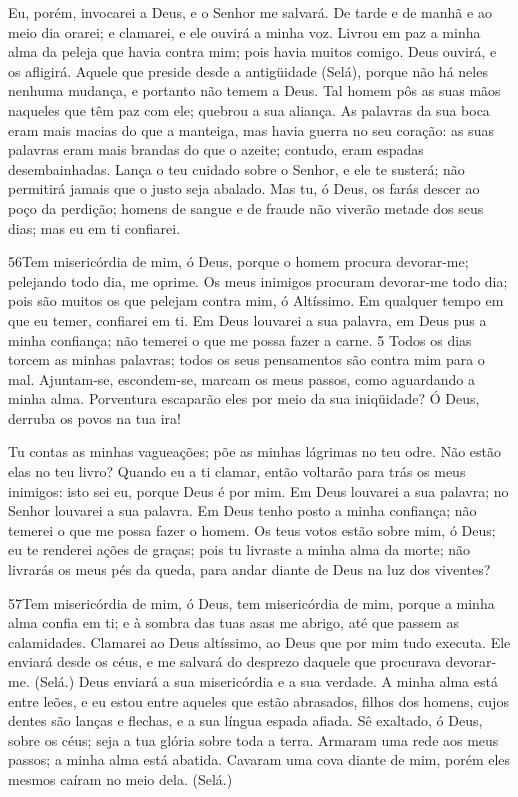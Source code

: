 Eu, porém, invocarei a Deus, e o Senhor me salvará. De
tarde e de manhã e ao meio dia orarei; e clamarei, e ele ouvirá a
minha voz. Livrou em paz a minha alma da peleja que havia
contra mim; pois havia muitos comigo. Deus ouvirá, e os
afligirá. Aquele que preside desde a antigüidade (Selá), porque não
há neles nenhuma mudança, e portanto não temem a Deus. Tal
homem pôs as suas mãos naqueles que têm paz com ele; quebrou a sua
aliança. As palavras da sua boca eram mais macias do que a
manteiga, mas havia guerra no seu coração: as suas palavras eram
mais brandas do que o azeite; contudo, eram espadas desembainhadas.
Lança o teu cuidado sobre o Senhor, e ele te susterá; não
permitirá jamais que o justo seja abalado. Mas tu, ó Deus, os
farás descer ao poço da perdição; homens de sangue e de fraude não
viverão metade dos seus dias; mas eu em ti confiarei.

\bigskip

\lettrine{56}{}Tem misericórdia de mim, ó Deus, porque o homem
procura devorar-me; pelejando todo dia, me oprime. Os meus
inimigos procuram devorar-me todo dia; pois são muitos os que
pelejam contra mim, ó Altíssimo. Em qualquer tempo em que eu
temer, confiarei em ti. Em Deus louvarei a sua palavra, em Deus
pus a minha confiança; não temerei o que me possa fazer a carne. 5
Todos os dias torcem as minhas palavras; todos os seus pensamentos
são contra mim para o mal. Ajuntam-se, escondem-se, marcam os
meus passos, como aguardando a minha alma. Porventura escaparão
eles por meio da sua iniqüidade? Ó Deus, derruba os povos na tua
ira!

Tu contas as minhas vagueações; põe as minhas lágrimas no teu
odre. Não estão elas no teu livro? Quando eu a ti clamar, então
voltarão para trás os meus inimigos: isto sei eu, porque Deus é por
mim. Em Deus louvarei a sua palavra; no Senhor louvarei a sua
palavra. Em Deus tenho posto a minha confiança; não temerei o
que me possa fazer o homem. Os teus votos estão sobre mim, ó
Deus; eu te renderei ações de graças; pois tu livraste a
minha alma da morte; não livrarás os meus pés da queda, para andar
diante de Deus na luz dos viventes?

\bigskip

\lettrine{57}{}Tem misericórdia de mim, ó Deus, tem
misericórdia de mim, porque a minha alma confia em ti; e à sombra
das tuas asas me abrigo, até que passem as calamidades. Clamarei
ao Deus altíssimo, ao Deus que por mim tudo executa. Ele enviará
desde os céus, e me salvará do desprezo daquele que procurava
devorar-me. (Selá.) Deus enviará a sua misericórdia e a sua verdade.
A minha alma está entre leões, e eu estou entre aqueles que
estão abrasados, filhos dos homens, cujos dentes são lanças e
flechas, e a sua língua espada afiada. Sê exaltado, ó Deus,
sobre os céus; seja a tua glória sobre toda a terra. Armaram uma
rede aos meus passos; a minha alma está abatida. Cavaram uma cova
diante de mim, porém eles mesmos caíram no meio dela. (Selá.)

